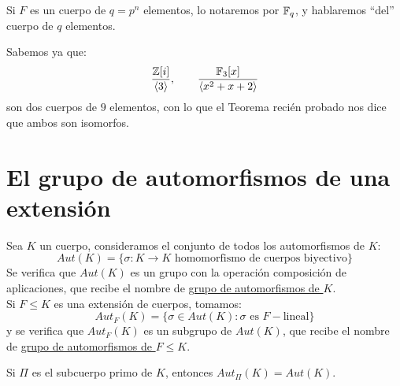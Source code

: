\begin{notacion}
    Si $F$ es un cuerpo de $q=p^n$ elementos, lo notaremos por $\mathbb{F}_q$, y hablaremos ``del'' cuerpo de $q$ elementos.
\end{notacion}

\begin{ejemplo}
    Sabemos ya que:
    \begin{equation*}
        \dfrac{\mathbb{Z}[i]}{\langle 3 \rangle }, \qquad \dfrac{\mathbb{F}_3[x]}{\langle x^2+x+2 \rangle }
    \end{equation*}
    son dos cuerpos de $9$ elementos, con lo que el Teorema recién probado nos dice que ambos son isomorfos.
\end{ejemplo}

\section{El grupo de automorfismos de una extensión}
\begin{definicion}
    Sea $K$ un cuerpo, consideramos el conjunto de todos los automorfismos de $K$:
    \begin{equation*}
        Aut(K) = \{\sigma:K\to K \text{\ homomorfismo de cuerpos biyectivo}\}
    \end{equation*}
    Se verifica que $Aut(K)$ es un grupo con la operación composición de aplicaciones, que recibe el nombre de \underline{grupo de automorfismos de $K$}. \\

    \noindent
    Si $F\leq K$ es una extensión de cuerpos, tomamos:
    \begin{equation*}
        Aut_F(K) = \{\sigma\in Aut(K) : \sigma \text{\ es\ } F-\text{lineal}\}
    \end{equation*}
    y se verifica que $Aut_F(K)$ es un subgrupo de $Aut(K)$, que recibe el nombre de \underline{grupo de automorfismos de $F\leq K$}.\\
\end{definicion}

\begin{ejercicio} %
    Si $\Pi$ es el subcuerpo primo de $K$, entonces $Aut_\Pi(K) = Aut(K)$.
\end{ejercicio}

